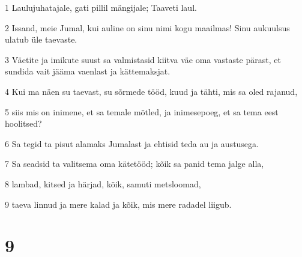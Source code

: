 \par 1 Laulujuhatajale, gati pillil mängijale; Taaveti laul.
\par 2 Issand, meie Jumal, kui auline on sinu nimi kogu maailmas! Sinu aukuulsus ulatub üle taevaste.
\par 3 Väetite ja imikute suust sa valmistasid kiitva väe oma vastaste pärast, et sundida vait jääma vaenlast ja kättemaksjat.
\par 4 Kui ma näen su taevast, su sõrmede tööd, kuud ja tähti, mis sa oled rajanud,
\par 5 siis mis on inimene, et sa temale mõtled, ja inimesepoeg, et sa tema eest hoolitsed?
\par 6 Sa tegid ta pisut alamaks Jumalast ja ehtisid teda au ja austusega.
\par 7 Sa seadsid ta valitsema oma kätetööd; kõik sa panid tema jalge alla,
\par 8 lambad, kitsed ja härjad, kõik, samuti metsloomad,
\par 9 taeva linnud ja mere kalad ja kõik, mis mere radadel liigub.

\chapter{9}

